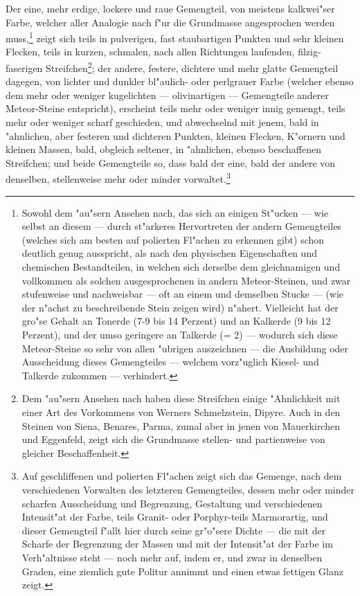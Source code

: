 \documentclass[a4paper, 11pt, oneside, german]{article}
\begin{document}
Der eine, mehr erdige, lockere und raue Gemengteil, von meistens kalkwei"ser Farbe, welcher aller Analogie nach f"ur die Grundmasse angesprochen werden muss,\footnote{Sowohl dem "au"sern Ansehen nach, das sich an einigen St"ucken --- wie selbst an diesem --- durch st"arkeres Hervortreten der andern Gemengteiles (welches sich am besten auf polierten Fl"achen zu erkennen gibt) schon deutlich genug ausspricht, als nach den physischen Eigenschaften und chemischen Bestandteilen, in welchen sich derselbe dem gleichnamigen und vollkommen als solchen ausgesprochenen in andern Meteor-Steinen, und zwar stufenweise und nachweisbar --- oft an einem und demselben Stucke --- (wie der n"achst zu beschreibende Stein zeigen wird) n"ahert. Vielleicht hat der gro"se Gehalt an Tonerde (7-9 bis 14 Perzent) und an Kalkerde (9 bis 12 Perzent), und der umso geringere an Talkerde (= 2) --- wodurch sich diese Meteor-Steine so sehr von allen "ubrigen auszeichnen --- die Ausbildung oder Ausscheidung dieses Gemengteiles --- welchem vorz"uglich Kiesel- und Talkerde zukommen --- verhindert.} zeigt sich teils in pulverigen, fast staubartigen Punkten und sehr kleinen Flecken, teils in kurzen, schmalen, nach allen Richtungen laufenden, filzig-faserigen Streifchen\footnote{Dem "au"sern Ansehen nach haben diese Streifchen einige "Ahnlichkeit mit einer Art des Vorkommens von Werners Schmelzstein, Dipyre. Auch in den Steinen von Siena, Benares, Parma, zumal aber in jenen von Mauerkirchen und Eggenfeld, zeigt sich die Grundmasse stellen- und partienweise von gleicher Beschaffenheit.}; der andere, festere, dichtere und mehr glatte Gemengteil dagegen, von lichter und dunkler bl"aulich- oder perlgrauer Farbe (welcher ebenso dem mehr oder weniger kugelichten --- olivinartigen --- Gemengteile anderer Meteor-Steine entspricht), erscheint teils mehr oder weniger innig gemengt, teils mehr oder weniger scharf geschieden, und abwechselnd mit jenem, bald in "ahnlichen, aber festeren und dichteren Punkten, kleinen Flecken, K"ornern und kleinen Massen, bald, obgleich seltener, in "ahnlichen, ebenso beschaffenen Streifchen; und beide Gemengteile so, dass bald der eine, bald der andere von denselben, stellenweise mehr oder minder vorwaltet.\footnote{Auf geschliffenen und polierten Fl"achen zeigt sich das Gemenge, nach dem verschiedenen Vorwalten des letzteren Gemengteiles, dessen mehr oder minder scharfen Ausscheidung und Begrenzung, Gestaltung und verschiedenen Intensit"at der Farbe, teils Granit- oder Porphyr-teils Marmorartig, und dieser Gemengteil f"allt hier durch seine gr"o"sere Dichte --- die mit der Scharfe der Begrenzung der Massen und mit der Intensit"at der Farbe im Verh"altnisse steht --- noch mehr auf, indem er, und zwar in denselben Graden, eine ziemlich gute Politur annimmt und einen etwas fettigen Glanz zeigt.}
\end{document}
